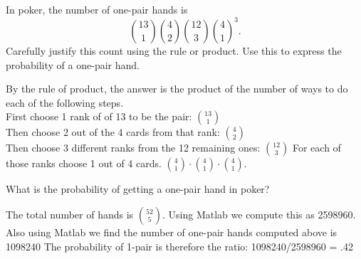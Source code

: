 




\numexamp 
In poker, the number of one-pair hands is
$$\binom{13}{1}\binom{4}{2}\binom{12}{3}\binom{4}{1}^3.$$
Carefully justify this count using the rule or product.  Use this to express the probability of a one-pair hand. 

\ans By the rule of product, the answer is the product of the number of
ways to do each of the following steps.\\
First choose 1 rank of of 13 to be the pair: $\binom{13}{1}$\\
Then choose 2 out of the 4 cards from that rank: $\binom{4}{2}$\\
Then choose 3 different ranks from  the 12 remaining ones: $\binom{12}{3}$
For each of those ranks choose 1 out of 4 cards. $\binom{4}{1}
\cdot\binom{4}{1}\cdot\binom{4}{1}$.


\numexamp 
What is the probability of getting a one-pair hand in poker?

\ans The total number of hands is $\binom{52}{5}$.  
Using Matlab we compute this as 2598960. Also using Matlab we
find the number of one-pair hands computed above is 1098240
The probability of 1-pair is therefore the ratio: 1098240/2598960
= .42


